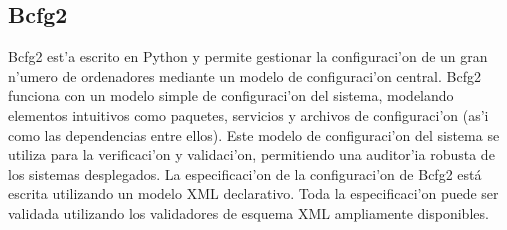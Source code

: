 \subsection{Bcfg2}
Bcfg2 est'a escrito en Python y permite gestionar la configuraci'on de un gran n'umero de ordenadores mediante un modelo de configuraci'on central. Bcfg2 funciona con un modelo simple de configuraci'on del sistema, modelando elementos intuitivos como paquetes, servicios y archivos de configuraci'on (as'i como las dependencias entre ellos). Este modelo de configuraci'on del sistema se utiliza para la verificaci'on  y validaci'on, permitiendo una auditor'ia robusta de los sistemas desplegados. La especificaci'on de la configuraci'on de Bcfg2 está escrita utilizando un modelo XML declarativo. Toda la especificaci'on puede ser validada utilizando los validadores de esquema XML ampliamente disponibles. \cite{bdfg215}




